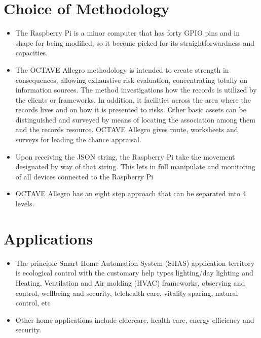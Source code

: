 \documentclass[12pt, letterpaper]{article}
\begin{document}
\section{Choice of Methodology}
\begin{itemize}
\item The Raspberry Pi is a minor computer that has forty GPIO pins and in shape for being modified, so it become picked for its straightforwardness and capacities.
\item The OCTAVE Allegro methodology is intended to create strength in consequences, allowing exhaustive risk evaluation, concentrating totally on information sources. The method investigations how the records is utilized by the clients or frameworks. In addition, it facilities across the area where the records lives and on how it is presented to risks. Other basic assets can be distinguished and surveyed by means of locating the association among them and the records resource. OCTAVE Allegro gives route, worksheets and surveys for leading the chance appraisal.
\item Upon receiving the JSON string, the Raspberry Pi take the movement designated by way of that string. This lets in full manipulate and monitoring of all devices connected to the Raspberry Pi
\item OCTAVE Allegro has an eight step approach that can be separated into 4 levels.
\end{itemize}
\hspace{2cm}
\section{Applications}
\begin{itemize}
\item The principle Smart Home Automation System (SHAS) application territory is ecological control with the customary help types lighting/day lighting and Heating, Ventilation and Air molding (HVAC) frameworks, observing and control, wellbeing and security, telehealth care, vitality sparing, natural control, etc
\item Other home applications include eldercare, health care, energy efficiency and security.
\end{itemize}
\end{document}
